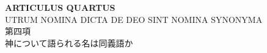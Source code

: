 \documentclass[paper=a4paper,fontsize=10pt,jafontsize=9pt,titlepage]{jlreq}
\begin{document}
%
%

\newpage
{}

\begin{center}
{\Large {\bfseries ARTICULUS QUARTUS}}\\
{\large UTRUM NOMINA DICTA DE DEO SINT NOMINA SYNONYMA\\
第四項\\
神について語られる名は同義語か}
\end{center}

{}
\setcounter{section}{4}
\setcounter{subsection}{0}
\end{document}
